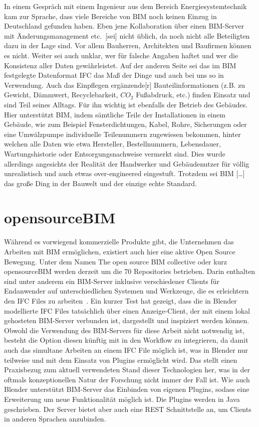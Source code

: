 In einem Gespräch mit einem Ingenieur aus dem Bereich \glqq{}Energiesystemtechnik\grqq{} kam zur Sprache, dass viele Bereiche von BIM noch keinen Einzug in Deutschland gefunden haben.
Eben jene \glqq{}Kollaboration über einen BIM-Server mit Änderungsmanagement etc.\ [sei] nicht üblich, da noch nicht alle Beteiligten dazu in der Lage sind. Vor allem Bauherren, Architekten und Baufirmen können es nicht\grqq{}.
Weiter sei \glqq{}auch unklar, wer für falsche Angaben haftet und wer die Konsistenz aller Daten gewährleistet\grqq{}.
Auf der anderen Seite sei \glqq{}das im BIM festgelegte Datenformat IFC das Maß der Dinge und auch bei uns so in Verwendung\grqq{}.
Auch das Einpflegen \glqq{}ergänzende[r] Bauteilinformationen (z.B. zu Gewicht, Dämmwert, Recyclebarkeit, \(CO_2\) Fußabdruck, etc.)\grqq{} finden Einsatz und sind Teil seines Alltags.
Für ihn wichtig ist ebenfalls der Betrieb des Gebäudes.
Hier unterstützt BIM, indem sämtliche Teile der Installationen in einem Gebäude, wie zum Beispiel Fensterdichtungen, Kabel, Rohre, Sicherungen oder eine Umwälzpumpe individuelle Teilenummern zugewiesen bekommen, hinter welchen alle Daten wie etwa Hersteller, Bestellnummern, Lebensdauer, Wartungshistorie oder Entsorgungsnachweise vermerkt sind.
Dies wurde allerdings \glqq{}angesichts der Realität der Handwerker und Gebäudenutzer für völlig unrealistisch und auch etwas over-engineered\grqq{} eingestuft.
Trotzdem sei \glqq{}BIM [\ldots] das große Ding in der Bauwelt und der einzige echte Standard\grqq{}.

\section{opensourceBIM}
Während es vorwiegend kommerzielle Produkte gibt, die Unternehmen das Arbeiten mit BIM ermöglichen, existiert auch hier eine aktive Open Source Bewegung.
Unter dem Namen \glqq{}The open source BIM collective\grqq{} oder kurz \glqq{}opensourceBIM\grqq{} werden derzeit um die 70 Repositories betrieben.
Darin enthalten sind unter anderem ein BIM-Server inklusive verschiedener Clients für Endanwender auf unterschiedlichen Systemen und Werkzeuge, die es erleichtern den IFC Files zu arbeiten~\cite{Theopens96:online}.
Ein kurzer Test hat gezeigt, dass die in Blender modellierte IFC Files tatsächlich über einen \glqq{}Anzeige-Client\grqq{}, der mit einem lokal gehosteten BIM-Server verbunden ist, dargestellt und inspiziert werden können.
Obwohl die Verwendung des BIM-Servers für diese Arbeit nicht notwendig ist, besteht die Option diesen künftig mit in den Workflow zu integrieren, da damit auch das simultane Arbeiten an einem IFC File möglich ist, was in Blender nur teilweise und mit dem Einsatz von Plugins ermöglicht wird.
Das stellt einen Praxisbezug zum aktuell verwendeten Stand dieser Technologien her, was in der oftmals konzeptionellen Natur der Forschung nicht immer der Fall ist.
Wie auch Blender unterstützt BIM-Server das Einbinden von eigenen Plugins, sodass eine Erweiterung um neue Funktionalität möglich ist.
Die Plugins werden in Java geschrieben.
Der Server bietet aber auch eine REST Schnittstelle an, um Clients in anderen Sprachen anzubinden.

